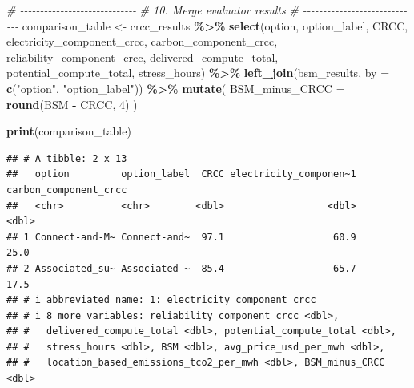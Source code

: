 \documentclass[
]{article}
\newenvironment{Shaded}{\begin{snugshade}}{\end{snugshade}}
\newcommand{\AttributeTok}[1]{\textcolor[rgb]{0.13,0.29,0.53}{#1}}
\newcommand{\CommentTok}[1]{\textcolor[rgb]{0.56,0.35,0.01}{\textit{#1}}}
\newcommand{\DecValTok}[1]{\textcolor[rgb]{0.00,0.00,0.81}{#1}}
\newcommand{\FunctionTok}[1]{\textcolor[rgb]{0.13,0.29,0.53}{\textbf{#1}}}
\newcommand{\NormalTok}[1]{#1}
\newcommand{\OtherTok}[1]{\textcolor[rgb]{0.56,0.35,0.01}{#1}}
\newcommand{\SpecialCharTok}[1]{\textcolor[rgb]{0.81,0.36,0.00}{\textbf{#1}}}
\newcommand{\StringTok}[1]{\textcolor[rgb]{0.31,0.60,0.02}{#1}}
\begin{document}
\begin{Shaded}
\begin{Highlighting}[]
\CommentTok{\# {-}{-}{-}{-}{-}{-}{-}{-}{-}{-}{-}{-}{-}{-}{-}{-}{-}{-}{-}{-}{-}{-}{-}{-}{-}{-}{-}{-}{-}}
\CommentTok{\# 10. Merge evaluator results}
\CommentTok{\# {-}{-}{-}{-}{-}{-}{-}{-}{-}{-}{-}{-}{-}{-}{-}{-}{-}{-}{-}{-}{-}{-}{-}{-}{-}{-}{-}{-}{-}}
\NormalTok{comparison\_table }\OtherTok{\textless{}{-}}\NormalTok{ crcc\_results }\SpecialCharTok{\%\textgreater{}\%}
  \FunctionTok{select}\NormalTok{(option, option\_label, CRCC,}
\NormalTok{         electricity\_component\_crcc,}
\NormalTok{         carbon\_component\_crcc,}
\NormalTok{         reliability\_component\_crcc,}
\NormalTok{         delivered\_compute\_total,}
\NormalTok{         potential\_compute\_total,}
\NormalTok{         stress\_hours) }\SpecialCharTok{\%\textgreater{}\%}
  \FunctionTok{left\_join}\NormalTok{(bsm\_results, }\AttributeTok{by =} \FunctionTok{c}\NormalTok{(}\StringTok{"option"}\NormalTok{, }\StringTok{"option\_label"}\NormalTok{)) }\SpecialCharTok{\%\textgreater{}\%}
  \FunctionTok{mutate}\NormalTok{(}
    \AttributeTok{BSM\_minus\_CRCC =} \FunctionTok{round}\NormalTok{(BSM }\SpecialCharTok{{-}}\NormalTok{ CRCC, }\DecValTok{4}\NormalTok{)}
\NormalTok{  )}

\FunctionTok{print}\NormalTok{(comparison\_table)}
\end{Highlighting}
\end{Shaded}

\begin{verbatim}
## # A tibble: 2 x 13
##   option         option_label  CRCC electricity_componen~1 carbon_component_crcc
##   <chr>          <chr>        <dbl>                  <dbl>                 <dbl>
## 1 Connect-and-M~ Connect-and~  97.1                   60.9                  25.0
## 2 Associated_su~ Associated ~  85.4                   65.7                  17.5
## # i abbreviated name: 1: electricity_component_crcc
## # i 8 more variables: reliability_component_crcc <dbl>,
## #   delivered_compute_total <dbl>, potential_compute_total <dbl>,
## #   stress_hours <dbl>, BSM <dbl>, avg_price_usd_per_mwh <dbl>,
## #   location_based_emissions_tco2_per_mwh <dbl>, BSM_minus_CRCC <dbl>
\end{verbatim}
\end{document}
